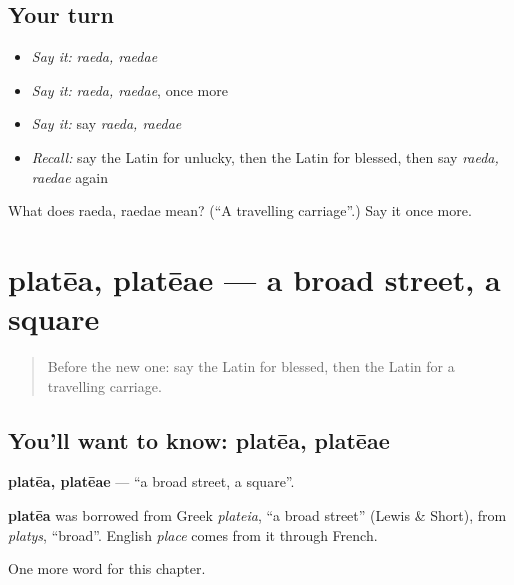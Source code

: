 \subsection*{Your turn}
\begin{itemize}
\raggedright
  \item \emph{Say it:} \emph{raeda, raedae}
  \item \emph{Say it:} \emph{raeda, raedae}, once more
  \item \emph{Say it:} say \emph{raeda, raedae}
  \item \emph{Recall:} say the Latin for unlucky, then the Latin for blessed, then say \emph{raeda, raedae} again
\end{itemize}

\begin{tcolorbox}[breakable,colback=teal!4,colframe=teal!35!black,title={Before you move on}]
What does raeda, raedae mean? (\textquotedblleft{}A travelling carriage\textquotedblright{}.) Say it once more.
\end{tcolorbox}
\section[platēa, platēae]{platēa, platēae — a broad street, a square}

\label{lesson:LA-C244-platea}



\begin{quote}
Before the new one: say the Latin for blessed, then the Latin for a travelling carriage.
\end{quote}

\subsection*{You'll want to know: platēa, platēae}
\textbf{platēa, platēae} — \textquotedblleft{}a broad street, a square\textquotedblright{}.

\begin{cousinweb}
\textbf{platēa} was borrowed from Greek \emph{plateia}, \textquotedblleft{}a broad street\textquotedblright{} (Lewis \& Short), from \emph{platys}, \textquotedblleft{}broad\textquotedblright{}. English \emph{place} comes from it through French.
\end{cousinweb}

\begin{grammarlens}[title={What you've built}]
One more word for this chapter.
\end{grammarlens}

